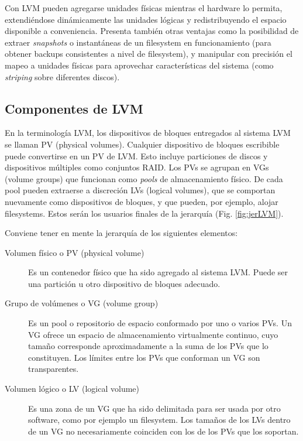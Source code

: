 Con LVM pueden agregarse unidades físicas mientras el hardware lo permita, extendiéndose dinámicamente las unidades lógicas y redistribuyendo el espacio disponible a conveniencia. Presenta también otras ventajas como la posibilidad de extraer \emph{snapshots} o instantáneas de un filesystem en funcionamiento (para obtener backups consistentes a nivel de filesystem), y manipular con precisión el mapeo a unidades físicas para aprovechar características del sistema (como \emph{striping} sobre diferentes discos).






\subsection{Componentes de LVM}
\label{sub:compLVM}
En la terminología LVM, los dispositivos de bloques entregados al sistema LVM se llaman PV (physical volumes). Cualquier dispositivo de bloques escribible puede convertirse en un PV de LVM. Esto incluye particiones de discos y dispositivos múltiples como conjuntos RAID. Los PVs se agrupan en VGs (volume groups) que funcionan como \emph{pools} de almacenamiento físico. De cada pool pueden extraerse a discreción LVs (logical volumes), que se comportan nuevamente como dispositivos de bloques, y que pueden, por ejemplo, alojar filesystems. Estos serán los usuarios finales de la jerarquía (Fig. \ref{fig:jerLVM}).



\begin{minipage}[c]{0.84\textwidth}
\begin{mdframed}
Conviene tener en mente la jerarquía de los siguientes elementos:
\begin{description}
	\item [Volumen físico o PV (physical volume)] Es un contenedor físico que ha sido agregado al sistema LVM. Puede ser una partición u otro dispositivo de bloques adecuado.
	\item [Grupo de volúmenes o VG (volume group)] Es un pool o repositorio de espacio conformado por uno o varios PVs. Un VG ofrece un espacio de almacenamiento virtualmente continuo, cuyo tamaño corresponde aproximadamente a la suma de los PVs que lo constituyen. Los límites entre los PVs que conforman un VG son transparentes.
	\item [Volumen lógico o LV (logical volume)] Es una zona de un VG que ha sido delimitada para ser usada por otro software, como por ejemplo un filesystem. Los tamaños de los LVs dentro de un VG no necesariamente coinciden con los de los PVs que los soportan.
\end{description}
\end{mdframed}
\end{minipage}

